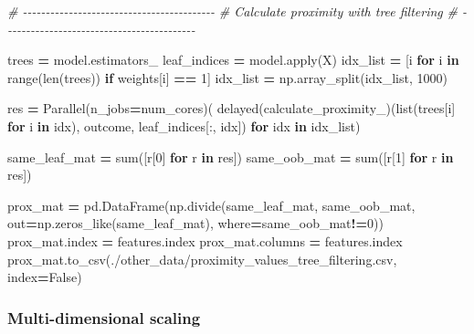 \documentclass[
  11pt,
  oneside]{book}
\newenvironment{Shaded}{\begin{snugshade}}{\end{snugshade}}
\newcommand{\BuiltInTok}[1]{#1}
\newcommand{\CommentTok}[1]{\textcolor[rgb]{0.56,0.35,0.01}{\textit{#1}}}
\newcommand{\ControlFlowTok}[1]{\textcolor[rgb]{0.13,0.29,0.53}{\textbf{#1}}}
\newcommand{\DecValTok}[1]{\textcolor[rgb]{0.00,0.00,0.81}{#1}}
\newcommand{\KeywordTok}[1]{\textcolor[rgb]{0.13,0.29,0.53}{\textbf{#1}}}
\newcommand{\NormalTok}[1]{#1}
\newcommand{\OperatorTok}[1]{\textcolor[rgb]{0.81,0.36,0.00}{\textbf{#1}}}
\newcommand{\StringTok}[1]{\textcolor[rgb]{0.31,0.60,0.02}{#1}}
\newcommand{\VariableTok}[1]{\textcolor[rgb]{0.00,0.00,0.00}{#1}}
\begin{document}
\begin{Shaded}
\begin{Highlighting}[]
\CommentTok{\# {-}{-}{-}{-}{-}{-}{-}{-}{-}{-}{-}{-}{-}{-}{-}{-}{-}{-}{-}{-}{-}{-}{-}{-}{-}{-}{-}{-}{-}{-}{-}{-}{-}{-}{-}{-}{-}{-}{-}{-}{-}{-}}
\CommentTok{\# Calculate proximity with tree filtering}
\CommentTok{\# {-}{-}{-}{-}{-}{-}{-}{-}{-}{-}{-}{-}{-}{-}{-}{-}{-}{-}{-}{-}{-}{-}{-}{-}{-}{-}{-}{-}{-}{-}{-}{-}{-}{-}{-}{-}{-}{-}{-}{-}{-}{-}}

\NormalTok{trees }\OperatorTok{=}\NormalTok{ model.estimators\_}
\NormalTok{leaf\_indices }\OperatorTok{=}\NormalTok{ model.}\BuiltInTok{apply}\NormalTok{(X)}
\NormalTok{idx\_list }\OperatorTok{=}\NormalTok{ [i }\ControlFlowTok{for}\NormalTok{ i }\KeywordTok{in} \BuiltInTok{range}\NormalTok{(}\BuiltInTok{len}\NormalTok{(trees)) }\ControlFlowTok{if}\NormalTok{ weights[i] }\OperatorTok{==} \DecValTok{1}\NormalTok{]}
\NormalTok{idx\_list }\OperatorTok{=}\NormalTok{ np.array\_split(idx\_list, }\DecValTok{1000}\NormalTok{)}

\NormalTok{res }\OperatorTok{=}\NormalTok{ Parallel(n\_jobs}\OperatorTok{=}\NormalTok{num\_cores)(}
\NormalTok{    delayed(calculate\_proximity\_)(}\BuiltInTok{list}\NormalTok{(trees[i] }\ControlFlowTok{for}\NormalTok{ i }\KeywordTok{in}\NormalTok{ idx), outcome, leaf\_indices[:, idx]) }\ControlFlowTok{for}\NormalTok{ idx }\KeywordTok{in}\NormalTok{ idx\_list)}

\NormalTok{same\_leaf\_mat }\OperatorTok{=} \BuiltInTok{sum}\NormalTok{([r[}\DecValTok{0}\NormalTok{] }\ControlFlowTok{for}\NormalTok{ r }\KeywordTok{in}\NormalTok{ res])}
\NormalTok{same\_oob\_mat }\OperatorTok{=} \BuiltInTok{sum}\NormalTok{([r[}\DecValTok{1}\NormalTok{] }\ControlFlowTok{for}\NormalTok{ r }\KeywordTok{in}\NormalTok{ res])}

\NormalTok{prox\_mat }\OperatorTok{=}\NormalTok{ pd.DataFrame(np.divide(same\_leaf\_mat, same\_oob\_mat, out}\OperatorTok{=}\NormalTok{np.zeros\_like(same\_leaf\_mat), }
\NormalTok{                        where}\OperatorTok{=}\NormalTok{same\_oob\_mat}\OperatorTok{!=}\DecValTok{0}\NormalTok{))}
\NormalTok{prox\_mat.index }\OperatorTok{=}\NormalTok{ features.index}
\NormalTok{prox\_mat.columns }\OperatorTok{=}\NormalTok{ features.index}
\NormalTok{prox\_mat.to\_csv(}\StringTok{\textquotesingle{}./other\_data/proximity\_values\_tree\_filtering.csv\textquotesingle{}}\NormalTok{, index}\OperatorTok{=}\VariableTok{False}\NormalTok{)}
\end{Highlighting}
\end{Shaded}

\hypertarget{multi-dimensional-scaling}{%
\subsubsection{Multi-dimensional scaling}\label{multi-dimensional-scaling}}
\end{document}
